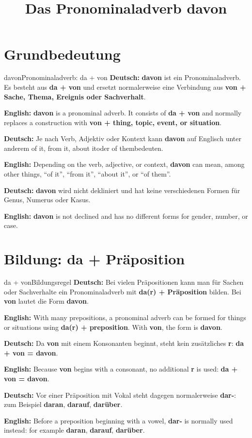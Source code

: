 \documentclass[a4paper,11pt]{article}
\title{Das Pronominaladverb \glqq davon\grqq}
\date{}
\newcommand{\GermanText}[1]{\textbf{Deutsch: }#1\par}
\newcommand{\EnglishText}[1]{{\small\color{SoftGray}\textbf{English: }#1\par}}
\begin{document}
    \maketitle
    \tableofcontents
    \newpage

    \section{Grundbedeutung}

        \begin{grammarentry}{davon}{Pronominaladverb: da + von}
            \GermanText{\textbf{davon} ist ein Pronominaladverb. Es besteht aus \textbf{da + von} und ersetzt normalerweise eine Verbindung aus \textbf{von + Sache, Thema, Ereignis oder Sachverhalt}.}
            \EnglishText{\textbf{davon} is a pronominal adverb. It consists of \textbf{da + von} and normally replaces a construction with \textbf{von + thing, topic, event, or situation}.}

            \GermanText{Je nach Verb, Adjektiv oder Kontext kann \textbf{davon} auf Englisch unter anderem \glqq of it\grqq, \glqq from it\grqq, \glqq about it\grqq oder \glqq of them\grqq bedeuten.}
            \EnglishText{Depending on the verb, adjective, or context, \textbf{davon} can mean, among other things, ``of it'', ``from it'', ``about it'', or ``of them''.}

            \GermanText{\textbf{davon} wird nicht dekliniert und hat keine verschiedenen Formen für Genus, Numerus oder Kasus.}
            \EnglishText{\textbf{davon} is not declined and has no different forms for gender, number, or case.}
        \end{grammarentry}

    \section{Bildung: da + Präposition}

        \begin{grammarentry}{da + von}{Bildungsregel}
            \GermanText{Bei vielen Präpositionen kann man für Sachen oder Sachverhalte ein Pronominaladverb mit \textbf{da(r) + Präposition} bilden. Bei \textbf{von} lautet die Form \textbf{davon}.}
            \EnglishText{With many prepositions, a pronominal adverb can be formed for things or situations using \textbf{da(r) + preposition}. With \textbf{von}, the form is \textbf{davon}.}

            \GermanText{Da \textbf{von} mit einem Konsonanten beginnt, steht kein zusätzliches \textbf{r}: \textbf{da + von = davon}.}
            \EnglishText{Because \textbf{von} begins with a consonant, no additional \textbf{r} is used: \textbf{da + von = davon}.}

            \GermanText{Vor einer Präposition mit Vokal steht dagegen normalerweise \textbf{dar-}: zum Beispiel \textbf{daran}, \textbf{darauf}, \textbf{darüber}.}
            \EnglishText{Before a preposition beginning with a vowel, \textbf{dar-} is normally used instead: for example \textbf{daran}, \textbf{darauf}, \textbf{darüber}.}
        \end{grammarentry}
\end{document}
